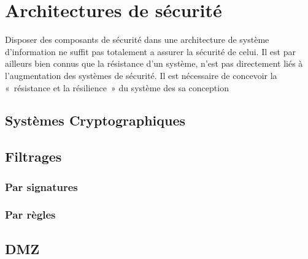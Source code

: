 

\section{Architectures de sécurité}

Disposer des composants de sécurité dans une architecture de système d'information ne suffit pas totalement a assurer la sécurité de celui. Il est par ailleurs bien connus que la résistance d'un système, n'est pas directement liés à l'augmentation des systèmes de sécurité. Il est nécessaire de concevoir la « résistance et la résilience » du système des sa conception

\subsection{Systèmes Cryptographiques}



\subsection{Filtrages}

\subsubsection{Par signatures}

\subsubsection{Par règles}

\subsection{DMZ}





